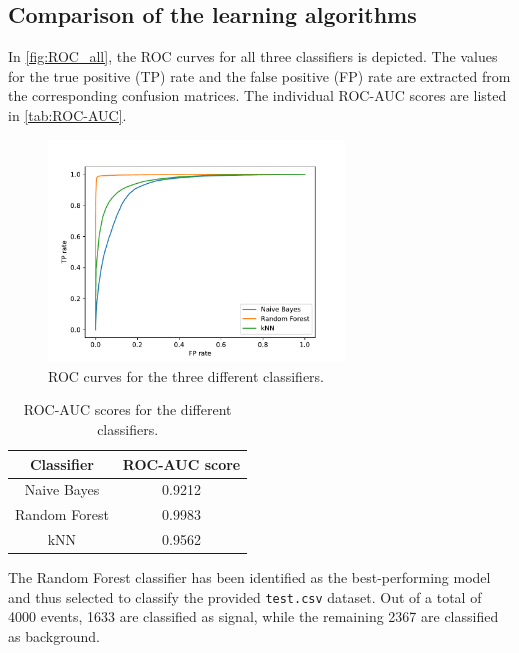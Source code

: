 \subsection{Comparison of the learning algorithms}
In \autoref{fig:ROC_all}, the ROC curves for all three classifiers is depicted. The values for the true positive (TP) rate and the false positive (FP) rate are
extracted from the corresponding confusion matrices. The individual ROC-AUC scores are listed in \autoref{tab:ROC-AUC}.
\begin{figure}[H]
    \centering
    \includegraphics[width=0.7\textwidth]{content/plots/ROC_all.pdf}
    \caption{ROC curves for the three different classifiers.}
    \label{fig:ROC_all}
\end{figure}
\begin{table}[H]
    \centering
    \caption{ROC-AUC scores for the different classifiers.}
    \label{tab:ROC-AUC}
      \begin{tabular}{c S}
        \toprule
        {Classifier} & {ROC-AUC score} \\
        \midrule
        {Naive Bayes}   & 0.9212 \\
        {Random Forest} & 0.9983 \\
        {kNN}           & 0.9562 \\
        \bottomrule 
      \end{tabular} 
  \end{table}

  The Random Forest classifier has been identified as the best-performing model and thus selected to classify the 
  provided \texttt{test.csv} dataset. Out of a total of 4000 events, 1633 are classified as signal, while the remaining 2367 
  are classified as background.
